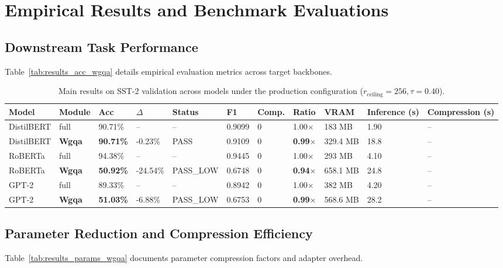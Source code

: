 \section{Empirical Results and Benchmark Evaluations}

\subsection{Downstream Task Performance}
Table~\ref{tab:results_acc_wgqa} details empirical evaluation metrics across target backbones.

\begin{table}[t]
\centering
\small
\begin{tabular}{lllllllllll}
\toprule
\textbf{Model} & \textbf{Module} & \textbf{Acc} & \textbf{$\Delta$} & \textbf{Status} & \textbf{F1} & \textbf{Comp.} & \textbf{Ratio} & \textbf{VRAM} & \textbf{Inference (s)} & \textbf{Compression (s)} \\
\midrule
DistilBERT & full & 90.71\% & -- & -- & 0.9099 & 0 & 1.00$\times$ & 183 MB & 1.90 & -- \\
DistilBERT & \textbf{Wgqa} & \textbf{90.71\%} & -0.23\% & PASS & 0.9109 & 0 & \textbf{0.99$\times$} & 329.4 MB & 18.8 & -- \\
RoBERTa & full & 94.38\% & -- & -- & 0.9445 & 0 & 1.00$\times$ & 293 MB & 4.10 & -- \\
RoBERTa & \textbf{Wgqa} & \textbf{50.92\%} & -24.54\% & PASS\_LOW & 0.6748 & 0 & \textbf{0.94$\times$} & 658.1 MB & 24.8 & -- \\
GPT-2 & full & 89.33\% & -- & -- & 0.8942 & 0 & 1.00$\times$ & 382 MB & 4.20 & -- \\
GPT-2 & \textbf{Wgqa} & \textbf{51.03\%} & -6.88\% & PASS\_LOW & 0.6753 & 0 & \textbf{0.99$\times$} & 568.6 MB & 28.2 & -- \\
\bottomrule
\end{tabular}
\caption{Main results on SST-2 validation across models under the production configuration ($r_{\mathrm{ceiling}}=256, \tau=0.40$).}
\label{tab:main_sst2}
\end{table}

\subsection{Parameter Reduction and Compression Efficiency}
Table~\ref{tab:results_params_wgqa} documents parameter compression factors and adapter overhead.

